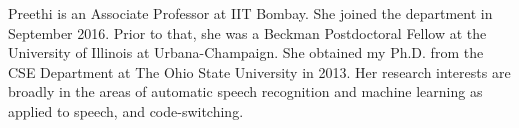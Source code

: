 Preethi is an Associate Professor at IIT Bombay. She joined the department in September 2016. Prior to that, she was a Beckman Postdoctoral Fellow at the University of Illinois at Urbana-Champaign. She obtained my Ph.D. from the CSE Department at The Ohio State University in 2013. Her research interests are broadly in the areas of automatic speech recognition and machine learning as applied to speech, and code-switching.